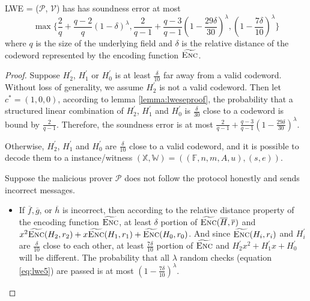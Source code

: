 \begin{lemma}
\label{lemma:lwese}

LWE = ($\mathcal{P}$, $\mathcal{V}$) has has soundness error at most 
$$
    \max
    \biggl\{
    \frac{2}{q} + \frac{q-2}{q}(1 - \delta)^\lambda, 
    \frac{2}{q-1} + \frac{q-3}{q-1}(1 - \frac{29\delta}{30})^\lambda,
    (1 - \frac{7\delta}{10})^\lambda
    \biggr\}
$$
where $q$ is the size of the underlying field and $\delta$ is the relative distance of the codeword represented by the encoding function $\widetilde{\textsc{Enc}}$.

\end{lemma}
\begin{proof}

Suppose $H_2^\prime$, $H_1^\prime$ or $H_0^\prime$ is at least $\frac{\delta}{10}$ far away from a valid codeword. Without loss of generality, we assume $H_2^\prime$ is not a valid codeword. Then let $c^* = (1, 0, 0)$, according to lemma \ref{lemma:lweseproof}, the probability that a structured linear combination of $H_2^\prime$, $H_1^\prime$ and $H_0^\prime$ is $\frac{\delta}{30}$ close to a codeword is bound by $\frac{2}{q-1}$. Therefore, the soundness error is at most $\frac{2}{q-1} + \frac{q-3}{q-1}(1 - \frac{29\delta}{30})^\lambda$.

Otherwise, $H_2^\prime$, $H_1^\prime$ and $H_0^\prime$ are $\frac{\delta}{10}$ close to a valid codeword, and it is possible to decode them to a instance/witness $(\mathbb{X}, \mathbb{W}) = ((\mathbb{F}, n, m, A, u), (s, e))$. 

Suppose the malicious prover $\mathcal{P}$ does not follow the protocol honestly and sends incorrect messages. 
\begin{itemize}

    \item If $\overline{f}, \overline{g}$, or $\overline{h}$ is incorrect, 
    then according to the relative distance property of the encoding function $\widetilde{\textsc{Enc}}$, 
    at least $\delta$ portion of $\widetilde{\textsc{Enc}}(\overline{H}, \overline{r})$ and
    $x^2\widetilde{\textsc{Enc}}(H_2, r_2) + x\widetilde{\textsc{Enc}}(H_1, r_1) + \widetilde{\textsc{Enc}}(H_0, r_0)$.
    And since $\widetilde{\textsc{Enc}}(H_i, r_i)$ and $H_i^\prime$ are $\frac{\delta}{10}$ close to each other, at least $\frac{7\delta}{10}$ portion of $\widetilde{\textsc{Enc}}$ and 
    $H_2^\prime x^2 + H_1^\prime x + H_0^\prime$ will be different. The probability that all $\lambda$ random checks (equation \ref{eq:lwe5}) are passed is at most $(1 - \frac{7\delta}{10})^\lambda$.
    

\end{itemize}
\end{proof}

